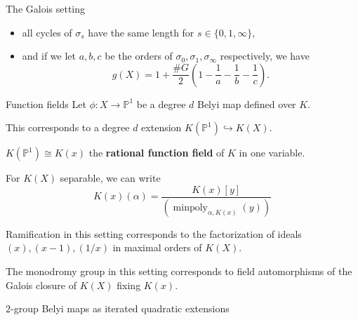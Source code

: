 \documentclass[xcolor=dvipsnames]{beamer}
\theoremstyle{plain}
\newcommand{\PP}{\mathbb P}
\DeclareMathOperator{\minpoly}{minpoly}
\begin{document}
{\begin{frame}{The Galois setting}
\begin{itemize}
        \item
          all cycles of $\sigma_s$ have the same
          length for $s\in\{0,1,\infty\}$,
        \item
          and if we let $a,b,c$ be the orders
          of $\sigma_0,\sigma_1,\sigma_\infty$
          respectively,
          we have
          \[
            g(X) = 1+\frac{\#G}{2}
            \left(
              1-\frac{1}{a}
              -\frac{1}{b}
              -\frac{1}{c}
            \right).
          \]
      \end{itemize}
    \end{frame}
    \begin{frame}{Function fields}
      Let $\phi\colon X\to\PP^1$ be
      a degree $d$ Belyi map defined over $K$.
      \pause\par
      This corresponds to a degree $d$
      extension
      $K(\PP^1)\hookrightarrow K(X)$.
      \pause\par
      $K(\PP^1)\cong K(x)$
      the
      \textbf{rational function field}
      of $K$ in one variable.
      \pause\par
      For
      $K(X)$ separable,
      we can write
      \[
        K(x)(\alpha) = \frac{K(x)[y]}{(\minpoly_{\alpha,K(x)}(y))}
      \]
      \pause\par
      Ramification in this setting corresponds
      to the factorization of ideals
      $(x),(x-1),(1/x)$
      in maximal orders of $K(X)$.
      \pause\par
      The monodromy group in this setting
      corresponds to field automorphisms
      of the Galois closure of $K(X)$
      fixing $K(x)$.
    \end{frame}
    \begin{frame}[fragile]{$2$-group Belyi maps as iterated quadratic extensions}
      \begin{center}
\end{center}
\end{frame}}
\end{document}
